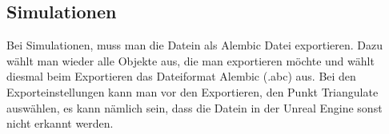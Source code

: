 \subsection{Simulationen}
Bei Simulationen, muss man die Datein als Alembic Datei exportieren. Dazu wählt man wieder alle Objekte aus, die man exportieren möchte und
wählt diesmal beim Exportieren das Dateiformat Alembic (.abc) aus. Bei den Exporteinstellungen kann man vor den Exportieren, den Punkt Triangulate auswählen,
es kann nämlich sein, dass die Datein in der Unreal Engine sonst nicht erkannt werden.